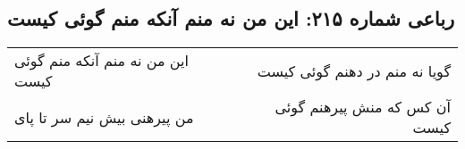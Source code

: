 \begin{center}
\section*{رباعی شماره ۲۱۵: این من نه منم آنکه منم گوئی کیست}
\label{sec:0215}
\begin{longtable}{l p{0.5cm} r}
این من نه منم آنکه منم گوئی کیست
&&
گویا نه منم در دهنم گوئی کیست
\\
من پیرهنی بیش نیم سر تا پای
&&
آن کس که منش پیرهنم گوئی کیست
\\
\end{longtable}
\end{center}
